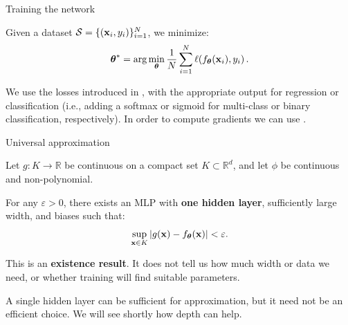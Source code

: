\begin{frame}{Training the network}
	\small
	\setlength{\abovedisplayskip}{6pt}\setlength{\belowdisplayskip}{6pt}
	\begin{tcolorbox}[nndsgreen]
		Given a dataset $\mathcal{S}=\{(\boldsymbol{\mathbf{x}}_i,y_i)\}_{i=1}^{N}$, we minimize:
		\[
			\boldsymbol{\theta}^{*}=\arg\min_{\boldsymbol{\theta}}\frac{1}{N}\sum_{i=1}^{N}
			\ell\!\left(f_{\boldsymbol{\theta}}(\boldsymbol{\mathbf{x}}_i),y_i\right).
		\]
	\end{tcolorbox}
	We use the losses introduced in \MLPLinearReference{}, with the appropriate output for regression or classification (i.e., adding a softmax or sigmoid for multi-class or binary classification, respectively). In order to compute gradients we can use .
\end{frame}

\begin{frame}{Universal approximation}
	\setlength{\abovedisplayskip}{6pt}\setlength{\belowdisplayskip}{6pt}
	\small
	\begin{tcolorbox}[nndsblue,fontupper=\small]
		Let $g:K\to\mathbb{R}$ be continuous on a compact set $K\subset\mathbb{R}^{d}$, and let $\phi$ be continuous and non-polynomial.

		For any $\varepsilon>0$, there exists an MLP with \textbf{one hidden layer}, sufficiently large width, and biases such that:
		\[
			\sup_{\boldsymbol{\mathbf{x}}\in K}\left|g(\boldsymbol{\mathbf{x}})-f_{\boldsymbol{\theta}}(\boldsymbol{\mathbf{x}})\right|<\varepsilon.
		\]
	\end{tcolorbox}
	This is an \textbf{existence result}. It does not tell us how much width or data we need, or whether training will find suitable parameters.

	A single hidden layer can be sufficient for approximation, but it need not be an efficient choice. We will see shortly how depth can help.
\end{frame}

